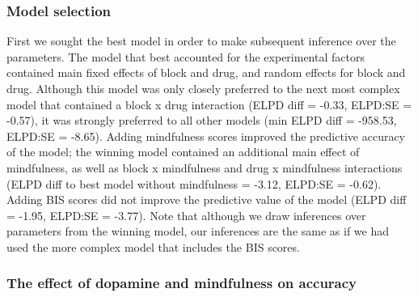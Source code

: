 \documentclass{article}
\begin{document}
\hypertarget{model-selection}{%
\subsubsection{Model selection}\label{model-selection}}

First we sought the best model in order to make subsequent inference
over the parameters. The model that best accounted for the experimental
factors contained main fixed effects of block and drug, and random
effects for block and drug. Although this model was only closely
preferred to the next most complex model that contained a block x drug
interaction (ELPD diff = -0.33, ELPD:SE = -0.57), it was strongly
preferred to all other models (min ELPD diff = -958.53, ELPD:SE =
-8.65). Adding mindfulness scores improved the predictive accuracy of
the model; the winning model contained an additional main effect of
mindfulness, as well as block x mindfulness and drug x mindfulness
interactions (ELPD diff to best model without mindfulness = -3.12,
ELPD:SE = -0.62). Adding BIS scores did not improve the predictive value
of the model (ELPD diff = -1.95, ELPD:SE = -3.77). Note that although we
draw inferences over parameters from the winning model, our inferences
are the same as if we had used the more complex model that includes the
BIS scores.

\hypertarget{the-effect-of-dopamine-and-mindfulness-on-accuracy}{%
\subsubsection{The effect of dopamine and mindfulness on
accuracy}\label{the-effect-of-dopamine-and-mindfulness-on-accuracy}}
\end{document}

